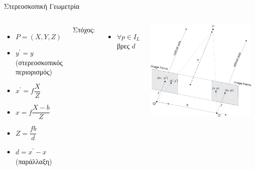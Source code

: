 \documentclass[english,greek]{beamer}
\begin{document}
\begin{frame}[t]{Στερεοσκοπική Γεωμετρία}
	\fontsize{11}{7.2}\selectfont
	\begin{columns}[onlytextwidth]
		\justifying		
		\begin{itemize}
			\item $P=(X,Y,Z)$
			\item $y^{'} = y$ (στερεοσκοπικός περιορισμός)
			\item $x^{'} = f\dfrac{X}{Z}$
			\item $x = f\dfrac{X - b}{Z}$
			\item $Z = \dfrac{fb}{d}$
			\item $d = x^{'}-x$ (παράλλαξη)
		\end{itemize}
		\vspace{3mm}
		
		Στόχος:
		\begin{itemize}
			\item $ \forall p \in I_L $ βρες $ d $
		\end{itemize}
		\includegraphics[width=\textwidth]{stereo_geometry.jpg}
	\end{columns}
\end{frame}
\end{document}
